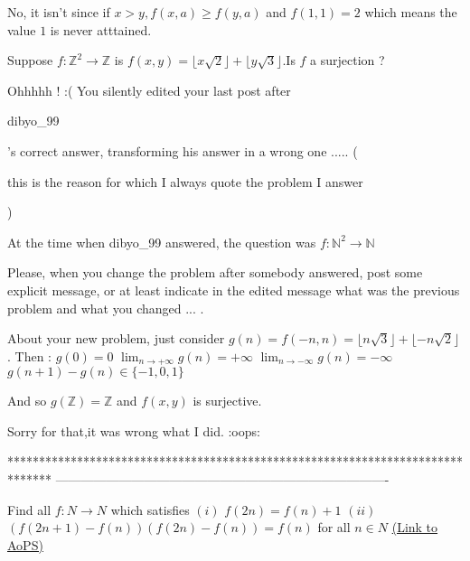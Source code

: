 \begin{solution}
	No, it isn't since if $x>y, f(x,a) \ge f(y,a)$ and $f(1,1)=2$ which means the value $1$ is never atttained.
\end{solution}



\begin{solution}
	\begin{tcolorbox}Suppose $f:\mathbb{Z}^{2}\rightarrow\mathbb{Z}$ is $f(x,y)=\lfloor{x}\sqrt{2}\rfloor+\lfloor{y}\sqrt{3}\rfloor$.Is $f$ a surjection ?\end{tcolorbox}
Ohhhhh ! :( You silently edited your last post after \begin{bolded}dibyo_99\end{bolded}'s correct answer, transforming his answer in a wrong one .....
(\begin{italicized}this is the reason for which I always quote the problem I answer\end{italicized})

At the time when dibyo_99 answered, the question was $f:\mathbb N^2\to\mathbb N$

Please, when you change the problem after somebody answered, post some explicit message, or at least indicate in the edited message what was the previous problem and what you changed ... .

About your new problem, just consider $g(n)=f(-n,n)=\lfloor n\sqrt 3\rfloor+\lfloor -n\sqrt 2\rfloor$. Then :
$g(0)=0$
$\lim_{n\to+\infty}g(n)=+\infty$
$\lim_{n\to-\infty}g(n)=-\infty$
$g(n+1)-g(n)\in\{-1,0,1\}$ 

And so $g(\mathbb Z)=\mathbb Z$ and $f(x,y)$ is surjective.
\end{solution}



\begin{solution}
	Sorry for that,it was wrong what I did. :oops:
\end{solution}
*******************************************************************************
-------------------------------------------------------------------------------

\begin{problem}
	Find all $f:N \to N$ which satisfies
$(i)$ $f(2n)=f(n)+1$
$(ii)$ $(f(2n+1)-f(n))(f(2n)-f(n))=f(n)$
for all $n\in N$
	\flushright \href{https://artofproblemsolving.com/community/c6h534510}{(Link to AoPS)}
\end{problem}



